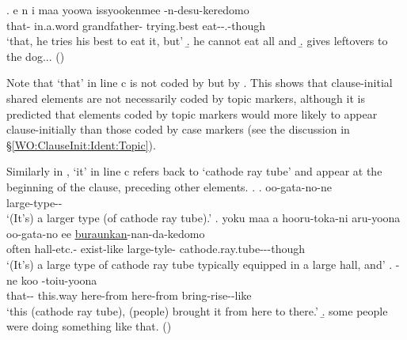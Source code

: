  \bg. e n  i maa yoowa  issyookenmee -n-desu-keredomo \\
     that-   in.a.word grandfather- trying.best eat--.-though \\
   `that, he tries his best to eat it, but'
 \b. he cannot eat all and
 \b. gives leftovers to the dog...
  \hfill{()}
%

Note that  `that' in line c is not coded by  but by .
This shows that clause-initial shared elements are not necessarily coded by topic markers,
although it is predicted that elements coded by topic markers would more likely to appear clause-initially than those coded by case markers (see the discussion in \S \ref{WO:ClauseInit:Ident:Topic}).

Similarly in \Next,
 `it' in line c refers back to  `cathode ray tube'
and appear at the beginning of the clause,
preceding other elements.
%
\ex.\label{PronIni2}
 \ag. oo-gata-no-ne \\
   large-type-- \\
   `(It's) a larger type (of cathode ray tube).'
 \bg. yoku maa a hooru-toka-ni aru-yoona oo-gata-no ee \ul{\ul{buraunkan}}-nan-da-kedomo \\
   often   hall-etc.- exist-like large-tyle-  cathode.ray.tube---though \\
   `(It's) a large type of cathode ray tube typically equipped in a large hall, and'
 \bg. -ne koo   -toiu-yoona \\
  that-- this.way here-from here-from bring-rise--like \\
  `this (cathode ray tube), (people) brought it from here to there.'
  \b. some people were doing something like that.
   \hfill{()}

